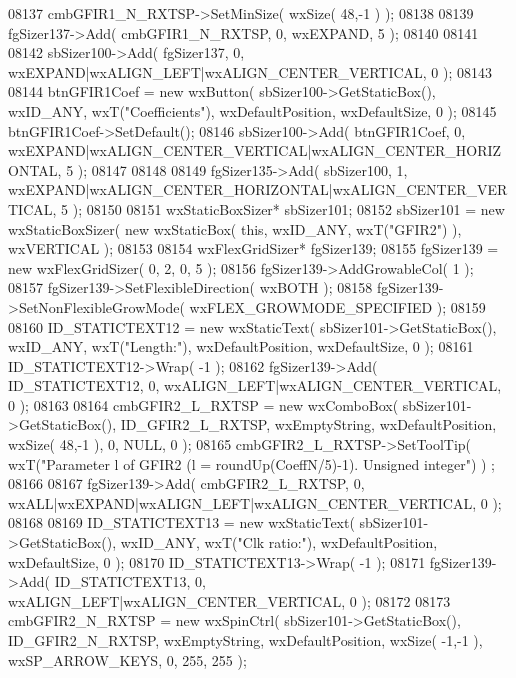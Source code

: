 \begin{DoxyCode}
08137     cmbGFIR1_N_RXTSP->SetMinSize( wxSize( 48,-1 ) );
08138     
08139     fgSizer137->Add( cmbGFIR1_N_RXTSP, 0, wxEXPAND, 5 );
08140     
08141     
08142     sbSizer100->Add( fgSizer137, 0, wxEXPAND|wxALIGN\_LEFT|wxALIGN\_CENTER\_VERTICAL, 0 );
08143     
08144     btnGFIR1Coef = \textcolor{keyword}{new} wxButton( sbSizer100->GetStaticBox(), wxID\_ANY, wxT(\textcolor{stringliteral}{"Coefficients"}), 
      wxDefaultPosition, wxDefaultSize, 0 );
08145     btnGFIR1Coef->SetDefault(); 
08146     sbSizer100->Add( btnGFIR1Coef, 0, wxEXPAND|wxALIGN\_CENTER\_VERTICAL|wxALIGN\_CENTER\_HORIZONTAL, 5 );
08147     
08148     
08149     fgSizer135->Add( sbSizer100, 1, wxEXPAND|wxALIGN\_CENTER\_HORIZONTAL|wxALIGN\_CENTER\_VERTICAL, 5 );
08150     
08151     wxStaticBoxSizer* sbSizer101;
08152     sbSizer101 = \textcolor{keyword}{new} wxStaticBoxSizer( \textcolor{keyword}{new} wxStaticBox( \textcolor{keyword}{this}, wxID\_ANY, wxT(\textcolor{stringliteral}{"GFIR2"}) ), wxVERTICAL );
08153     
08154     wxFlexGridSizer* fgSizer139;
08155     fgSizer139 = \textcolor{keyword}{new} wxFlexGridSizer( 0, 2, 0, 5 );
08156     fgSizer139->AddGrowableCol( 1 );
08157     fgSizer139->SetFlexibleDirection( wxBOTH );
08158     fgSizer139->SetNonFlexibleGrowMode( wxFLEX\_GROWMODE\_SPECIFIED );
08159     
08160     ID_STATICTEXT12 = \textcolor{keyword}{new} wxStaticText( sbSizer101->GetStaticBox(), wxID\_ANY, wxT(\textcolor{stringliteral}{"Length:"}), 
      wxDefaultPosition, wxDefaultSize, 0 );
08161     ID_STATICTEXT12->Wrap( -1 );
08162     fgSizer139->Add( ID_STATICTEXT12, 0, wxALIGN\_LEFT|wxALIGN\_CENTER\_VERTICAL, 0 );
08163     
08164     cmbGFIR2_L_RXTSP = \textcolor{keyword}{new} wxComboBox( sbSizer101->GetStaticBox(), 
      ID_GFIR2_L_RXTSP, wxEmptyString, wxDefaultPosition, wxSize( 48,-1 ), 0, NULL, 0 ); 
08165     cmbGFIR2_L_RXTSP->SetToolTip( wxT(\textcolor{stringliteral}{"Parameter l of GFIR2 (l = roundUp(CoeffN/5)-1). Unsigned integer"}) )
      ;
08166     
08167     fgSizer139->Add( cmbGFIR2_L_RXTSP, 0, wxALL|wxEXPAND|wxALIGN\_LEFT|wxALIGN\_CENTER\_VERTICAL, 0 );
08168     
08169     ID_STATICTEXT13 = \textcolor{keyword}{new} wxStaticText( sbSizer101->GetStaticBox(), wxID\_ANY, wxT(\textcolor{stringliteral}{"Clk ratio:"}), 
      wxDefaultPosition, wxDefaultSize, 0 );
08170     ID_STATICTEXT13->Wrap( -1 );
08171     fgSizer139->Add( ID_STATICTEXT13, 0, wxALIGN\_LEFT|wxALIGN\_CENTER\_VERTICAL, 0 );
08172     
08173     cmbGFIR2_N_RXTSP = \textcolor{keyword}{new} wxSpinCtrl( sbSizer101->GetStaticBox(), 
      ID_GFIR2_N_RXTSP, wxEmptyString, wxDefaultPosition, wxSize( -1,-1 ), wxSP\_ARROW\_KEYS, 0, 255, 255 );

\end{DoxyCode}

